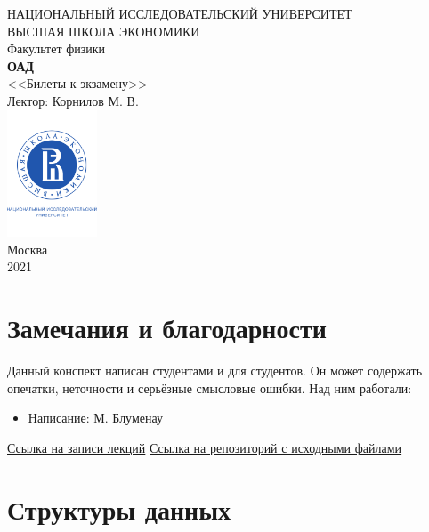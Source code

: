 \documentclass[a4paper, 12pt]{article}
\begin{document}
	\begin{titlepage}
		\begin{center}
			$$$$
			$$$$
			$$$$
			$$$$
			{\Large{НАЦИОНАЛЬНЫЙ ИССЛЕДОВАТЕЛЬСКИЙ УНИВЕРСИТЕТ}}\\
			\vspace{0.1cm}
			{\Large{ВЫСШАЯ ШКОЛА ЭКОНОМИКИ}}\\
			\vspace{0.25cm}
			{\large{Факультет физики}}\\
			\vspace{5.5cm}
			{\Huge\textbf{{ОАД}}}\\%
			\vspace{1cm}
			{\LARGE{<<Билеты к экзамену>>}}\\%
			\vspace{1cm}
			{\LARGE{Лектор: Корнилов М. В.}}\\%
			\vspace{2cm}
			\vfill
			\includegraphics[width = 0.2\textwidth]{HSElogo}\\
			\vfill
			Москва\\
			2021
		\end{center}
	\end{titlepage}
	
	\tableofcontents
	\newpage
	\section*{Замечания и благодарности}
	Данный конспект написан студентами и для студентов. Он может содержать опечатки, неточности и серьёзные смысловые ошибки.
	Над ним работали:
	\begin{itemize}
		\item Написание:
		\subitem М. Блуменау
	\end{itemize}
	\href{}{Ссылка на записи лекций} 
	\newline
	\href{}{Ссылка на репозиторий с исходными файлами} 
	\newpage
	\section*{Структуры данных}
\end{document}
